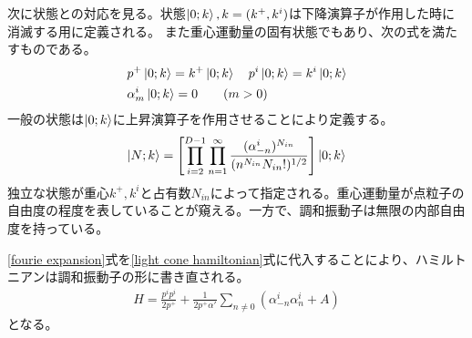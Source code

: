 \documentclass[11pt, dvipdfmx]{article}
\numberwithin{equation}{section}
\newcommand{\blankline}{\par\vspace{\baselineskip}} %
\begin{document}
\blankline
次に状態との対応を見る。状態$\ket{0;k},k=(k^+,k^i)$は下降演算子が作用した時に消滅する用に定義される。
また重心運動量の固有状態でもあり、次の式を満たすものである。
\begin{align}
    &p^+ \ket{0;k} = k^+ \ket{0;k}  \quad
 p^i \ket{0;k} = k^i \ket{0;k} \\
&\alpha_m^i \ket{0;k} = 0  \ \ \ \quad( m > 0) 
\end{align}
一般の状態は$\ket{0;k}$に上昇演算子を作用させることにより定義する。
\begin{align}
    \ket{N;k} = \qty[ \prod_{i=2}^{D-1} \prod_{n=1}^{\infty}
  \frac{(\alpha_{-n}^i)^{N_{in}}}{(n^{N_{in}} N_{in}!)^{1/2}} ] \ket{0;k}
\end{align}
独立な状態が重心$k^+,k^i$と占有数$N_{in}$によって指定される。重心運動量が点粒子の自由度の程度を表していることが窺える。一方で、調和振動子は無限の内部自由度を持っている。
\blankline
\eqref{fourie expansion}式を\eqref{light cone hamiltonian}式に代入することにより、ハミルトニアンは調和振動子の形に書き直される。
\begin{align}
    H=\frac{p^ip^i}{2p^+}+\frac{1}{2p^+ \alpha'} \sum_{n\neq 0} (\alpha_{-n}^i \alpha_n^i+A)
\end{align}
となる。
\end{document}
